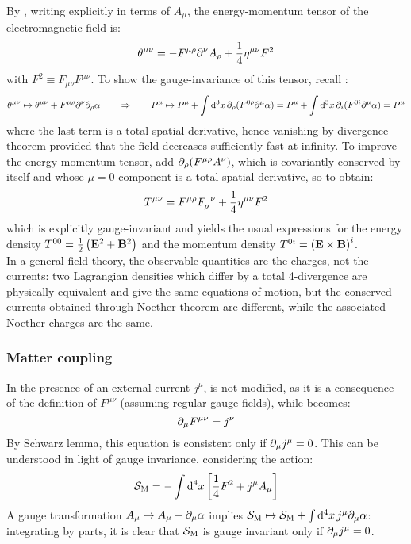 By , writing  explicitly in terms of $ A_\mu $, the energy-momentum tensor of the electromagnetic field is:
\begin{equation}
  \theta^{\mu \nu} = - F^{\mu \rho} \partial^\nu A_\rho + \frac{1}{4} \eta^{\mu \nu} F^2
\end{equation}
with $ F^2 \equiv F_{\mu \nu} F^{\mu \nu} $. To show the gauge-invariance of this tensor, recall :
\begin{equation*}
  \theta^{\mu \nu} \mapsto \theta^{\mu \nu} + F^{\mu \rho} \partial^\nu \partial_\rho \alpha
  \qquad \Rightarrow \qquad
  P^\mu \mapsto P^\mu + \int \mathrm{d}^3x\, \partial_\rho (F^{0 \rho} \partial^\mu \alpha) = P^\mu + \int \mathrm{d}^3x\, \partial_i (F^{0i} \partial^\mu \alpha) = P^\mu
\end{equation*}
where the last term is a total spatial derivative, hence vanishing by divergence theorem provided that the field decreases sufficiently fast at infinity. To improve the energy-momentum tensor, add $ \partial_\rho (F^{\mu \rho} A^\nu) $, which is covariantly conserved by itself and whose $ \mu = 0 $ component is a total spatial derivative, so to obtain:
\begin{equation}
  T^{\mu \nu} = F^{\mu \rho} \tensor{F}{_\rho^\nu} + \frac{1}{4} \eta^{\mu \nu} F^2
\end{equation}
which is explicitly gauge-invariant and yields the usual expressions for the energy density $ T^{00} = \frac{1}{2} \left( \mathbf{E}^2 + \mathbf{B}^2 \right) $ and the momentum density $ T^{0i} = \left( \mathbf{E} \times \mathbf{B} \right)^i $.\\
In a general field theory, the observable quantities are the charges, not the currents: two Lagrangian densities which differ by a total 4-divergence are physically equivalent and give the same equations of motion, but the conserved currents obtained through Noether theorem are different, while the associated Noether charges are the same.

\subsubsection{Matter coupling}

In the presence of an external current $ j^\mu $,  is not modified, as it is a consequence of the definition of $ F^{\mu \nu} $ (assuming regular gauge fields), while  becomes:
\begin{equation}
  \partial_\mu F^{\mu \nu} = j^\nu
  \label{eq:maxw-3}
\end{equation}
By Schwarz lemma, this equation is consistent only if $ \partial_\mu j^\mu = 0 $. This can be understood in light of gauge invariance, considering the action:
\begin{equation}
  \mathcal{S}_\text{M} = - \int \mathrm{d}^4x \left[ \frac{1}{4} F^2 + j^\mu A_\mu \right]
\end{equation}
A gauge transformation $ A_\mu \mapsto A_\mu - \partial_\mu \alpha $ implies $ \mathcal{S}_\text{M} \mapsto \mathcal{S}_\text{M} + \int \mathrm{d}^4x\, j^\mu \partial_\mu \alpha $: integrating by parts, it is clear that $ \mathcal{S}_\text{M} $ is gauge invariant only if $ \partial_\mu j^\mu = 0 $.

